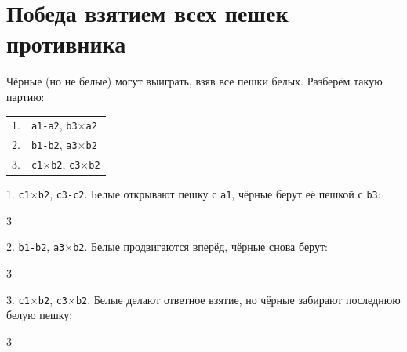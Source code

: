 \documentclass[12pt,a4paper]{article}
\begin{document}
\newpage


\section*{Победа взятием всех пешек противника}

Чёрные (но не белые) могут выиграть, взяв все пешки белых. Разберём такую партию:

\begin{center}
\begin{tabular}{ll}
1. & \texttt{a1-a2}, \texttt{b3$\times$a2} \\
2. & \texttt{b1-b2}, \texttt{a3$\times$b2} \\
3. & \texttt{c1$\times$b2}, \texttt{c3$\times$b2}
\end{tabular}
\end{center}

1. \texttt{c1$\times$b2}, \texttt{c3-c2}.
Белые открывают пешку с \texttt{a1}, чёрные берут её пешкой с \texttt{b3}:
\begin{multicols}{3}
\columnbreak \par
{}
\columnbreak \par
{}
\end{multicols}

2. \texttt{b1-b2}, \texttt{a3$\times$b2}.
Белые продвигаются вперёд, чёрные снова берут:
\begin{multicols}{3}
\columnbreak \par
{}
\columnbreak \par
{}
\end{multicols}

3. \texttt{c1$\times$b2}, \texttt{c3$\times$b2}.
Белые делают ответное взятие, но чёрные забирают последнюю белую пешку:
\begin{multicols}{3}
\columnbreak \par
{}
\columnbreak \par
{}
\end{multicols}
\end{document}
